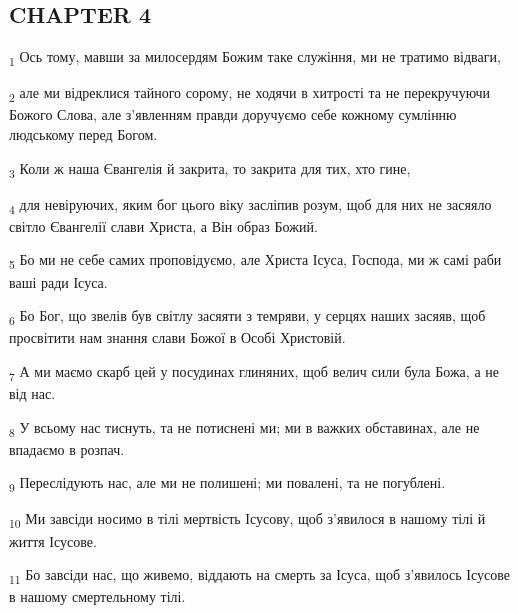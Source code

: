 \subsection{CHAPTER 4}
\begin{tcolorbox}
\textsubscript{1} Ось тому, мавши за милосердям Божим таке служіння, ми не тратимо відваги,
\end{tcolorbox}
\begin{tcolorbox}
\textsubscript{2} але ми відреклися тайного сорому, не ходячи в хитрості та не перекручуючи Божого Слова, але з'явленням правди доручуємо себе кожному сумлінню людському перед Богом.
\end{tcolorbox}
\begin{tcolorbox}
\textsubscript{3} Коли ж наша Євангелія й закрита, то закрита для тих, хто гине,
\end{tcolorbox}
\begin{tcolorbox}
\textsubscript{4} для невіруючих, яким бог цього віку засліпив розум, щоб для них не засяяло світло Євангелії слави Христа, а Він образ Божий.
\end{tcolorbox}
\begin{tcolorbox}
\textsubscript{5} Бо ми не себе самих проповідуємо, але Христа Ісуса, Господа, ми ж самі раби ваші ради Ісуса.
\end{tcolorbox}
\begin{tcolorbox}
\textsubscript{6} Бо Бог, що звелів був світлу засяяти з темряви, у серцях наших засяяв, щоб просвітити нам знання слави Божої в Особі Христовій.
\end{tcolorbox}
\begin{tcolorbox}
\textsubscript{7} А ми маємо скарб цей у посудинах глиняних, щоб велич сили була Божа, а не від нас.
\end{tcolorbox}
\begin{tcolorbox}
\textsubscript{8} У всьому нас тиснуть, та не потиснені ми; ми в важких обставинах, але не впадаємо в розпач.
\end{tcolorbox}
\begin{tcolorbox}
\textsubscript{9} Переслідують нас, але ми не полишені; ми повалені, та не погублені.
\end{tcolorbox}
\begin{tcolorbox}
\textsubscript{10} Ми завсіди носимо в тілі мертвість Ісусову, щоб з'явилося в нашому тілі й життя Ісусове.
\end{tcolorbox}
\begin{tcolorbox}
\textsubscript{11} Бо завсіди нас, що живемо, віддають на смерть за Ісуса, щоб з'явилось Ісусове в нашому смертельному тілі.
\end{tcolorbox}
